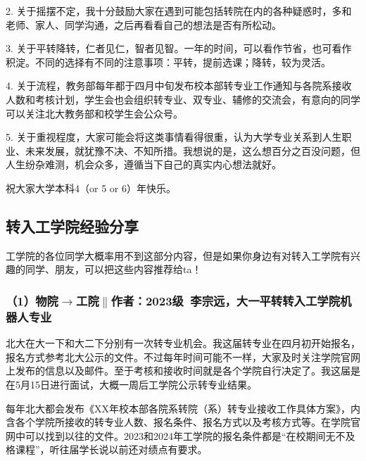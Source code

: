 \vspace{10pt}

2. 关于摇摆不定，我十分鼓励大家在遇到可能包括转院在内的各种疑惑时，多和老师、家人、同学沟通，之后再看看自己的想法是否有所松动。

\vspace{10pt}

3. 关于平转降转，仁者见仁，智者见智。一年的时间，可以看作节省，也可看作积淀。不同的选择有不同的注意事项：平转，提前选课；降转，较为灵活。

\vspace{10pt}

4. 关于流程，教务部每年都于四月中旬发布校本部转专业工作通知与各院系接收人数和考核计划，学生会也会组织转专业、双专业、辅修的交流会，有意向的同学可以关注北大教务部和校学生会公众号。

\vspace{10pt}

5. 关于重视程度，大家可能会将这类事情看得很重，认为大学专业关系到人生职业、未来发展，就犹豫不决、不知所措。我想说的是，这么想百分之百没问题，但人生纷杂难测，机会众多，遵循当下自己的真实内心想法就好。

\vspace{10pt}

祝大家大学本科4（or 5 or 6）年快乐。

\subsection{转入工学院经验分享}

工学院的各位同学大概率用不到这部分内容，但是如果你身边有对转入工学院有兴趣的同学、朋友，可以把这些内容推荐给ta！

\subsubsection{（1）物院$\to$工院$\parallel$作者：2023级\ 李宗远，大一平转转入工学院机器人专业}

北大在大一下和大二下分别有一次转专业机会。我这届转专业在四月初开始报名，报名方式参考北大公示的文件。不过每年时间可能不一样，大家及时关注学院官网上发布的信息以及邮件。至于考核和接收时间就是各个学院自行决定了。我这届是在5月15日进行面试，大概一周后工学院公示转专业结果。

\vspace{10pt}

每年北大都会发布《XX年校本部各院系转院（系）转专业接收工作具体方案》，内含各个学院所接收的转专业人数、报名条件、报名方式以及考核方式等。在学院官网中可以找到以往的文件。2023和2024年工学院的报名条件都是“在校期间无不及格课程”，听往届学长说以前还对绩点有要求。

